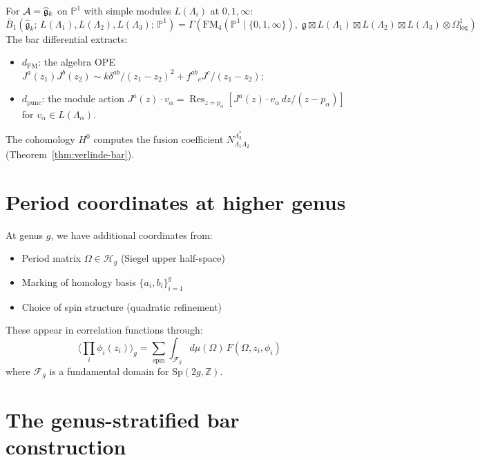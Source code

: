 \begin{example}\label{ex:log-fm-km}
For $\mathcal{A} = \widehat{\mathfrak{g}}_k$ on $\mathbb{P}^1$ with
simple modules $L(\Lambda_i)$ at $0, 1, \infty$:
\[
\bar{B}_1(\widehat{\mathfrak{g}}_k;\,
L(\Lambda_1), L(\Lambda_2), L(\Lambda_3);\, \mathbb{P}^1)
= \Gamma(\mathrm{FM}_4(\mathbb{P}^1 \mathbin{|} \{0,1,\infty\}),\;
\mathfrak{g} \boxtimes L(\Lambda_1) \boxtimes L(\Lambda_2)
\boxtimes L(\Lambda_3) \otimes \Omega^1_{\log})
\]
The bar differential extracts:
\begin{itemize}
\item $d_{\mathrm{FM}}$: the algebra OPE
  $J^a(z_1) J^b(z_2) \sim k\delta^{ab}/(z_1 - z_2)^2
  + f^{ab}{}_c J^c/(z_1 - z_2)$;
\item $d_{\mathrm{punc}}$: the module action
  $J^a(z) \cdot v_\alpha
  = \operatorname{Res}_{z=p_\alpha}
  [J^a(z) \cdot v_\alpha \, dz/(z - p_\alpha)]$
  for $v_\alpha \in L(\Lambda_\alpha)$.
\end{itemize}
The cohomology $H^0$ computes the fusion coefficient
$N_{\Lambda_1 \Lambda_2}^{\Lambda_3^*}$
\textup{(}Theorem~\textup{\ref{thm:verlinde-bar})}.
\end{example}

\section{Period coordinates at higher genus}

At genus $g$, we have additional coordinates from:
\begin{itemize}
\item Period matrix $\Omega \in \mathcal{H}_g$ (Siegel upper half-space)
\item Marking of homology basis $\{a_i, b_i\}_{i=1}^g$
\item Choice of spin structure (quadratic refinement)
\end{itemize}

These appear in correlation functions through:
\[\langle \prod_i \phi_i(z_i) \rangle_g = \sum_{\text{spin}} \int_{\mathcal{F}_g} d\mu(\Omega) \, F(\Omega, z_i, \phi_i)\]
where $\mathcal{F}_g$ is a fundamental domain for $\text{Sp}(2g, \mathbb{Z})$.

\section{The genus-stratified bar construction}

